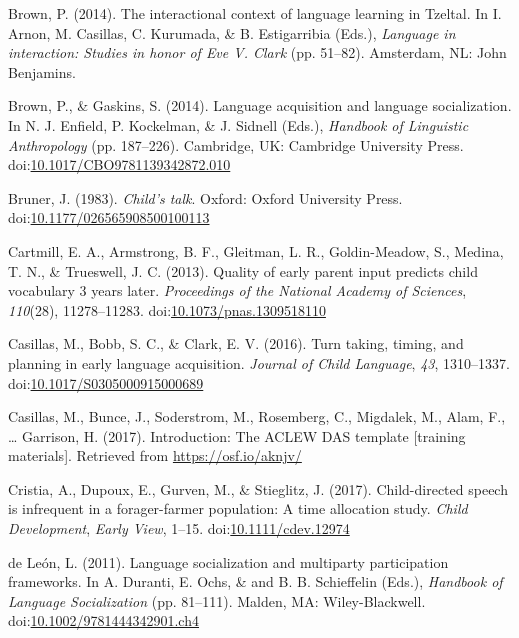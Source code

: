 \documentclass[floatsintext,man]{apa6}
\theoremstyle{definition}
\theoremstyle{definition}
\theoremstyle{definition}
\theoremstyle{remark}
\begin{document}
\hypertarget{ref-brown2014interactional}{}
Brown, P. (2014). The interactional context of language learning in
Tzeltal. In I. Arnon, M. Casillas, C. Kurumada, \& B. Estigarribia
(Eds.), \emph{Language in interaction: Studies in honor of Eve V. Clark}
(pp. 51--82). Amsterdam, NL: John Benjamins.

\hypertarget{ref-brown2014language}{}
Brown, P., \& Gaskins, S. (2014). Language acquisition and language
socialization. In N. J. Enfield, P. Kockelman, \& J. Sidnell (Eds.),
\emph{Handbook of Linguistic Anthropology} (pp. 187--226). Cambridge,
UK: Cambridge University Press.
doi:\href{https://doi.org/10.1017/CBO9781139342872.010}{10.1017/CBO9781139342872.010}

\hypertarget{ref-bruner1983childs}{}
Bruner, J. (1983). \emph{Child's talk}. Oxford: Oxford University Press.
doi:\href{https://doi.org/10.1177/026565908500100113}{10.1177/026565908500100113}

\hypertarget{ref-cartmill2013quality}{}
Cartmill, E. A., Armstrong, B. F., Gleitman, L. R., Goldin-Meadow, S.,
Medina, T. N., \& Trueswell, J. C. (2013). Quality of early parent input
predicts child vocabulary 3 years later. \emph{Proceedings of the
National Academy of Sciences}, \emph{110}(28), 11278--11283.
doi:\href{https://doi.org/10.1073/pnas.1309518110}{10.1073/pnas.1309518110}

\hypertarget{ref-casillas2016turn}{}
Casillas, M., Bobb, S. C., \& Clark, E. V. (2016). Turn taking, timing,
and planning in early language acquisition. \emph{Journal of Child
Language}, \emph{43}, 1310--1337.
doi:\href{https://doi.org/10.1017/S0305000915000689}{10.1017/S0305000915000689}

\hypertarget{ref-casillas2017ACLEWDAS}{}
Casillas, M., Bunce, J., Soderstrom, M., Rosemberg, C., Migdalek, M.,
Alam, F., \ldots{} Garrison, H. (2017). Introduction: The ACLEW DAS
template {[}training materials{]}. Retrieved from
\url{https://osf.io/aknjv/}

\hypertarget{ref-cristia2017child}{}
Cristia, A., Dupoux, E., Gurven, M., \& Stieglitz, J. (2017).
Child-directed speech is infrequent in a forager-farmer population: A
time allocation study. \emph{Child Development}, \emph{Early View},
1--15. doi:\href{https://doi.org/10.1111/cdev.12974}{10.1111/cdev.12974}

\hypertarget{ref-deleon2011language}{}
de León, L. (2011). Language socialization and multiparty participation
frameworks. In A. Duranti, E. Ochs, \& and B. B. Schieffelin (Eds.),
\emph{Handbook of Language Socialization} (pp. 81--111). Malden, MA:
Wiley-Blackwell.
doi:\href{https://doi.org/10.1002/9781444342901.ch4}{10.1002/9781444342901.ch4}
\end{document}
